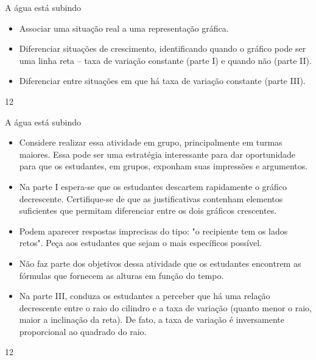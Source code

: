 \def\currentcolor{session1}
\clearmargin
\begin{objectives}{A água está subindo}
{
\begin{itemize}

\item  Associar uma situação real a uma representação gráfica.

\item Diferenciar situações de crescimento, identificando quando o gráfico pode ser uma linha reta – taxa de variação constante (parte I) e quando não (parte II).

\item Diferenciar entre situações em que há taxa de variação constante (parte III).

\end{itemize}
}{1}{2}
\end{objectives}
\marginpar{\vspace{-2em}}
\begin{sugestions}{A água está subindo}
{
\begin{itemize}
\item Considere realizar essa atividade em grupo, principalmente em turmas maiores. Essa pode ser uma estratégia interessante para dar oportunidade para que os estudantes, em grupos, exponham suas impressões e argumentos.

\item Na parte I espera-se que os estudantes descartem rapidamente o gráfico decrescente. Certifique-se de que as justificativas contenham elementos suficientes que permitam diferenciar entre os dois gráficos crescentes.
\item Podem aparecer respostas imprecisas do tipo: "o recipiente tem os lados retos". Peça aos estudantes que sejam o mais específicos possível.
\item Não faz parte dos objetivos dessa atividade que os estudantes encontrem as fórmulas que fornecem as alturas em função do tempo.
\item Na parte III, conduza os estudantes a perceber que há uma relação decrescente entre o raio do cilindro e a taxa de variação (quanto menor o raio, maior a inclinação da reta). De fato, a taxa de variação é inversamente proporcional ao quadrado do raio.
\end{itemize}
}{1}{2}
\end{sugestions}
\clearmargin
\marginpar{\vspace{.5em}}

